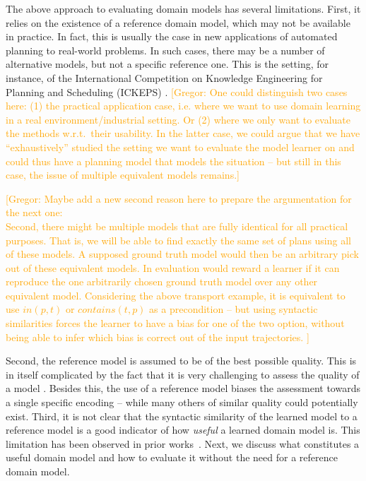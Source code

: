 \documentclass{article}
\theoremstyle{definition}
\theoremstyle{remark}
\newcommand{\roni}[1]{{\textcolor{red}{[Roni: #1]}}}
\newcommand{\gregor}[1]{{\textcolor{orange}{[Gregor: #1]}}}
\begin{document}
The above approach to evaluating domain models has several limitations. 
First, it relies on the existence of a reference domain model, which may not be available in practice. 
In fact, this is usually the case in new applications of automated planning to real-world problems. In such cases, there may be a number of alternative models, but not a specific reference one. This is the setting, for instance, of the International Competition on Knowledge Engineering for Planning and Scheduling (ICKEPS) \citep{DBLP:journals/aim/ChrpaMVV17}.
\gregor{One could distinguish two cases here: (1) the practical application case, i.e. where we want to use domain learning in a real environment/industrial setting. Or (2) where we only want to evaluate the methods w.r.t.\ their usability. In the latter case, we could argue that we have ``exhaustively'' studied the setting we want to evaluate the model learner on and could thus have a planning model that models the situation -- but still in this case, the issue of multiple equivalent models remains.}


\gregor{Maybe add a new second reason here to prepare the argumentation for the next one:\\
Second, there might be multiple models that are fully identical for all practical purposes.
That is, we will be able to find exactly the same set of plans using all of these models.
A supposed ground truth model would then be an arbitrary pick out of these equivalent models.
In evaluation would reward a learner if it can reproduce the one arbitrarily chosen ground truth model over any other equivalent model.
Considering the above transport example, it is equivalent to use $in(p,t)$ or $contains(t,p)$ as a precondition -- but using syntactic similarities forces the learner to have a bias for one of the two option, without being able to infer which bias is correct out of the input trajectories.
}

Second, the reference model is assumed to be of the best possible quality. This is in itself complicated by the fact that it is very challenging to assess the quality of a model \citep{DBLP:conf/kcap/McCluskeyVV17}. Besides this, the use of a reference model biases the assessment towards a single specific encoding -- while many others of similar quality could potentially exist.
Third, it is not clear that the syntactic similarity of the learned model to a reference model is a good indicator of how \emph{useful} a learned domain model is. This limitation has been observed in prior works~\citep{aineto2019learning,juba2021safe,mordoch2024safe}.
Next, we discuss what constitutes a useful domain model and how to evaluate it without the need for a reference domain model.
\end{document}

